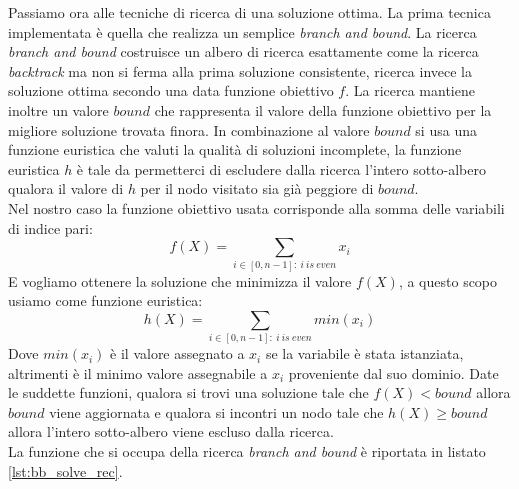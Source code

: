 \documentclass[10pt, a4paper]{article}
\begin{document}
Passiamo ora alle tecniche di ricerca di una soluzione ottima. La prima tecnica implementata è quella che realizza un semplice \textit{branch and bound}. La ricerca \textit{branch and bound} costruisce un albero di ricerca esattamente come la ricerca \textit{backtrack} ma non si ferma alla prima soluzione consistente, ricerca invece la soluzione ottima secondo una data funzione obiettivo $f$. La ricerca mantiene inoltre un valore $bound$ che rappresenta il valore della funzione obiettivo per la migliore soluzione trovata finora. In combinazione al valore $bound$ si usa una funzione euristica che valuti la qualità di soluzioni incomplete, la funzione euristica $h$ è tale da permetterci di escludere dalla ricerca l'intero sotto-albero qualora il valore di $h$ per il nodo visitato sia già peggiore di $bound$.\\
Nel nostro caso la funzione obiettivo usata corrisponde alla somma delle variabili di indice pari:
\begin{equation*}
f(X) = \sum_{i \in [0,n-1]:~i~is~even} x_i
\end{equation*}
E vogliamo ottenere la soluzione che minimizza il valore $f(X)$, a questo scopo usiamo come funzione euristica:
\begin{equation*}
h(X) = \sum_{i \in [0,n-1]:~i~is~even} min(x_i)
\end{equation*}
Dove $min(x_i)$ è il valore assegnato a $x_i$ se la variabile è stata istanziata, altrimenti è il minimo valore assegnabile a $x_i$ proveniente dal suo dominio. Date le suddette funzioni, qualora si trovi una soluzione tale che $f(X) < bound$ allora $bound$ viene aggiornata e qualora si incontri un nodo tale che $h(X) \geq bound$ allora l'intero sotto-albero viene escluso dalla ricerca.\\
La funzione che si occupa della ricerca \textit{branch and bound} è riportata in listato \ref{lst:bb_solve_rec}.
\end{document}
